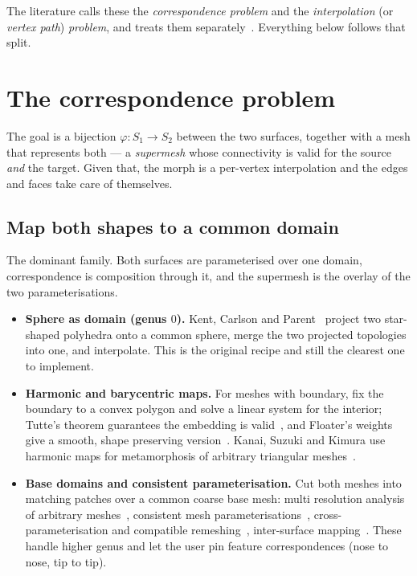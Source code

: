 \documentclass[11pt,a4paper]{article}
\newcommand{\src}{S_1}
\newcommand{\dst}{S_2}
\begin{document}
The literature calls these the \emph{correspondence problem} and the
\emph{interpolation} (or \emph{vertex path}) \emph{problem}, and treats them
separately~\cite{alexa2002,lazarus1998}. Everything below follows that split.

\section{The correspondence problem}

The goal is a bijection $\varphi:\src\to\dst$ between the two surfaces,
together with a mesh that represents both --- a \emph{supermesh} whose
connectivity is valid for the source \emph{and} the target. Given that, the
morph is a per-vertex interpolation and the edges and faces take care of
themselves.

\subsection{Map both shapes to a common domain}

The dominant family. Both surfaces are parameterised over one domain,
correspondence is composition through it, and the supermesh is the overlay
of the two parameterisations.

\begin{itemize}[leftmargin=1.4em]
  \item \textbf{Sphere as domain (genus $0$).} Kent, Carlson and
    Parent~\cite{kent1992} project two star-shaped polyhedra onto a common
    sphere, merge the two projected topologies into one, and interpolate.
    This is the original recipe and still the clearest one to implement.
  \item \textbf{Harmonic and barycentric maps.} For meshes with boundary,
    fix the boundary to a convex polygon and solve a linear system for the
    interior; Tutte's theorem guarantees the embedding is
    valid~\cite{tutte1963}, and Floater's weights give a smooth, shape
    preserving version~\cite{floater1997}. Kanai, Suzuki and Kimura use
    harmonic maps for metamorphosis of arbitrary triangular
    meshes~\cite{kanai2000}.
  \item \textbf{Base domains and consistent parameterisation.} Cut both
    meshes into matching patches over a common coarse base mesh: multi
    resolution analysis of arbitrary meshes~\cite{eck1995}, consistent mesh
    parameterisations~\cite{praun2001}, cross-parameterisation and
    compatible remeshing~\cite{kraevoy2004}, inter-surface
    mapping~\cite{schreiner2004}. These handle higher genus and let the user
    pin feature correspondences (nose to nose, tip to tip).
\end{itemize}
\end{document}
